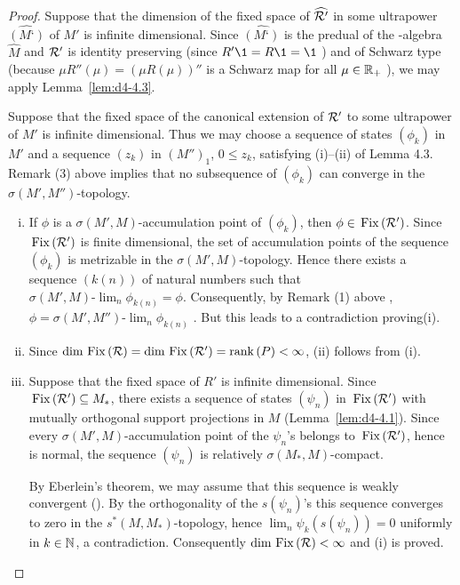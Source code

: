 \begin{proof}
Suppose that the dimension of the fixed space of $ \widehat{\mathcal{R}'} $  in some ultrapower $ \widehat{(M‘)} $  of $ M' $  is infinite dimensional.
Since $ \widehat{(M‘)} $ is the predual of the \WA-algebra $ \widehat{M} $  and $ \mathcal{R}' $  is identity preserving (since $ R'\1 = R\1 = \1 $ ) and of Schwarz type (because $ \mu R''(\mu) = (\mu R(\mu))'' $  is a Schwarz map for all $ \mu \in \mathbb{R}_{+} $ ), we may apply Lemma~\ref{lem:d4-4.3}.

Suppose that the fixed space of the canonical extension of $ \mathcal{R}' $  to some ultrapower of $ M' $  is infinite dimensional.
Thus we may choose a sequence of states $ (\phi_{k}) $  in $ M' $  and a sequence $ (z_{k}) $  in $ (M'')_{1}$, $ 0 \leq z_{k} $,  satisfying (i)--(ii) of Lemma 4.3.
Remark (3) above implies that no subsequence of $ (\phi_{k}) $  can converge in the $ \sigma(M',M'') $-topology.
\begin{enumerate}[(i), wide]
\item
If $ \phi $  is a $ \sigma(M',M) $-accumulation point of $ (\phi_{k}) $, then $ \phi \in \mathop{}\mathrm{Fix}\left(\mathcal{R}'\right) $.
Since $ \mathop{}\mathrm{Fix}\left(\mathcal{R}'\right) $  is finite dimensional, the set of accumulation points of the sequence $ (\phi_{k}) $  is metrizable in the $ \sigma(M',M) $-topology.
Hence there exists a sequence $ (k(n)) $  of natural numbers such that $ \sigma(M',M)\text{-}\lim_{n} \phi_{k(n)} = \phi $.
Consequently, by Remark (1) above , $ \phi = \sigma(M',M'')\text{-}\lim_{n} \phi_{k(n)} $  .
But this leads to a contradiction proving(i).

\item
Since $ \dim \mathop{}\mathrm{Fix}\left(\mathcal{R}\right) = \dim \mathop{}\mathrm{Fix}\left(\mathcal{R}'\right) = \mathop{}\!\mathrm{rank}\,(P) < \infty $, (ii) follows from (i).

\item
Suppose that the fixed space of $ R' $  is infinite dimensional.
Since $ \mathop{}\mathrm{Fix}\left(\mathcal{R}'\right) \subseteq M_{*} $,  there exists a sequence of states $ (\psi_{n}) $  in $ \mathop{}\mathrm{Fix}\left(\mathcal{R}'\right) $  with mutually orthogonal support projections in $ M $  (Lemma~\ref{lem:d4-4.1}).
Since every $ \sigma(M',M) $-accumulation point of the $ \psi_{n} $'s belongs to $ \mathop{}\mathrm{Fix}\left(\mathcal{R}'\right) $, hence is normal, the sequence $ (\psi_{n}) $  is relatively $ \sigma(M_{*},M) $-compact.

By Eberlein's theorem, we may assume that this sequence is weakly convergent (\citet{schaefer:1966}).
By the orthogonality of the $ s(\psi_{n}) $'s this sequence converges to zero in the $ s^{*}(M,M_{*}) $-topology, hence $ \lim_{n} \psi_{k}(s(\psi_{n})) = 0 $  uniformly in $ k \in \mathbb{N} $, a contradiction.
Consequently $ \dim \mathop{}\mathrm{Fix}\left(\mathcal{R}\right) < \infty $  and (i) is proved.


\end{enumerate}
\end{proof}
